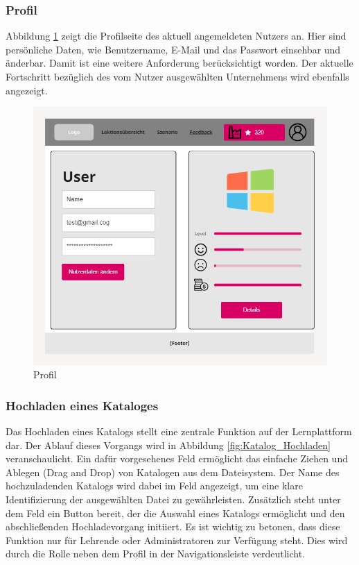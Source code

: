 \subsubsection{Profil}

Abbildung \ref{fig:Profil Mock-Up} zeigt die Profilseite des aktuell angemeldeten Nutzers an. Hier sind persönliche Daten, wie Benutzername, E-Mail und das Passwort einsehbar und änderbar. Damit ist eine weitere Anforderung berücksichtigt worden. 
Der aktuelle Fortschritt bezüglich des vom Nutzer ausgewählten Unternehmens wird ebenfalls angezeigt.

\begin{figure}[H]
    \centering
    \includegraphics[width=1.0\textwidth]{assets/screenshots/mockups/Profil-MockUp.png}
    \caption{Profil}
    \label{fig:Profil Mock-Up}
\end{figure}

\subsubsection{Hochladen eines Kataloges}

Das Hochladen eines Katalogs stellt eine zentrale Funktion auf der Lernplattform dar. Der Ablauf dieses Vorgangs wird in Abbildung \ref{fig:Katalog_Hochladen} veranschaulicht.
Ein dafür vorgesehenes Feld ermöglicht das einfache Ziehen und Ablegen (Drag and Drop) von Katalogen aus dem Dateisystem. 
Der Name des hochzuladenden Katalogs wird dabei im Feld angezeigt, um eine klare Identifizierung der ausgewählten Datei zu gewährleisten.
Zusätzlich steht unter dem Feld ein Button bereit, der die Auswahl eines Katalogs ermöglicht und den abschließenden Hochladevorgang initiiert. 
Es ist wichtig zu betonen, dass diese Funktion nur für Lehrende oder Administratoren zur Verfügung steht. Dies wird durch die Rolle neben dem Profil in der Navigationsleiste verdeutlicht. 
 

